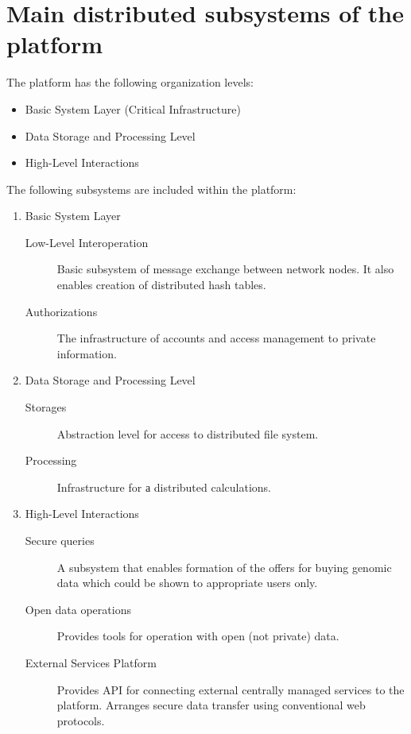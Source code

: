 \section{Main distributed subsystems of the platform}
The platform has the following organization levels:
\begin{itemize}
  \item Basic System Layer (Critical Infrastructure)
  \item Data Storage and Processing Level
  \item High-Level Interactions
\end{itemize}

The following subsystems are included within the platform:
\begin{enumerate}
  \item Basic System Layer
  \begin{description}
    \item[Low-Level Interoperation]
      Basic subsystem of message exchange between network nodes.
      It also enables creation of distributed hash tables.
    \item[Authorizations]
      The infrastructure of accounts and access management to private information.
  \end{description}

  \item Data Storage and Processing Level
  \begin{description}
    \item[Storages]
      Abstraction level for access to distributed file system.
    \item[Processing]
      Infrastructure for а distributed calculations.
  \end{description}

  \item High-Level Interactions
  \begin{description}
    \item[Secure queries]
      A subsystem that enables formation of the offers for buying genomic data which could be shown to appropriate users only.
    \item[Open data operations]
      Provides tools for operation with open (not private) data.
    \item[External Services Platform]
      Provides API for connecting external centrally managed services to the platform. Arranges secure data transfer using conventional web protocols.
  \end{description}

\end{enumerate}
